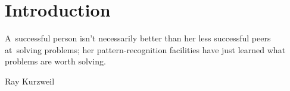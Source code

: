 \chapter*{Introduction}

\epigraph{
  A~successful person isn't necessarily better than her less successful peers at~solving problems;
  her pattern-recognition facilities have just learned what problems are worth solving.
}{Ray Kurzweil}
